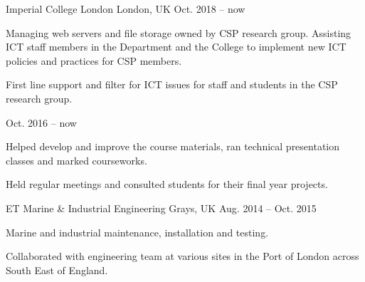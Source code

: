 

\begin{cventries}
            {Imperial College London} %
            {London, UK} %
            {Oct. 2018 -- now} %
            {
                \begin{cvitems} %
                    \item {Managing web servers and file storage owned by CSP research group. Assisting ICT staff members in the Department and the College to implement new ICT policies and practices for CSP members.}
                    \item {First line support and filter for ICT issues for staff and students in the CSP research group.}
                \end{cvitems}
            }

            {} %
            {} %
            {Oct. 2016 -- now} %
            {
                \begin{cvitems} %
                    \item {Helped develop and improve the course materials, ran technical presentation classes and marked courseworks.}
                    \item {Held regular meetings and consulted students for their final year projects.}
                \end{cvitems}
            }

            {ET Marine	\& Industrial Engineering} %
            {Grays, UK} %
            {Aug. 2014 -- Oct. 2015} %
            {
                \begin{cvitems} %
                    \item {Marine and industrial maintenance, installation and testing.}
                    \item {Collaborated with engineering team at various sites in the Port of London across South East of England.}
                \end{cvitems}
            }
\end{cventries}
